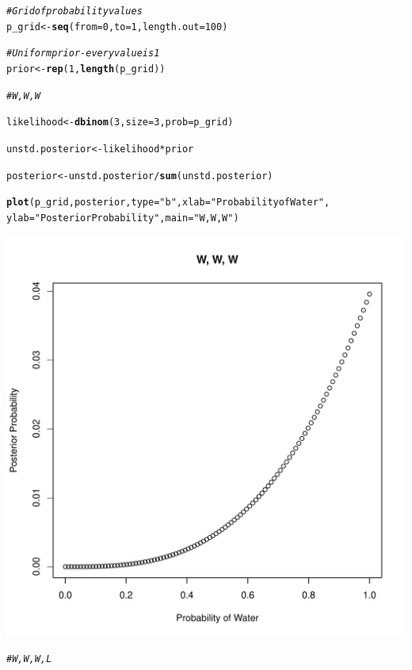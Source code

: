 \documentclass[12pt]{article}\usepackage[]{graphicx}\usepackage[]{color}
\makeatletter
\def\maxwidth{ %
  \ifdim\Gin@nat@width>\linewidth
    \linewidth
  \else
    \Gin@nat@width
  \fi
}
\newcommand{\hlnum}[1]{\textcolor[rgb]{0.686,0.059,0.569}{#1}}%
\newcommand{\hlstr}[1]{\textcolor[rgb]{0.192,0.494,0.8}{#1}}%
\newcommand{\hlcom}[1]{\textcolor[rgb]{0.678,0.584,0.686}{\textit{#1}}}%
\newcommand{\hlopt}[1]{\textcolor[rgb]{0,0,0}{#1}}%
\newcommand{\hlstd}[1]{\textcolor[rgb]{0.345,0.345,0.345}{#1}}%
\newcommand{\hlkwb}[1]{\textcolor[rgb]{0.69,0.353,0.396}{#1}}%
\newcommand{\hlkwc}[1]{\textcolor[rgb]{0.333,0.667,0.333}{#1}}%
\newcommand{\hlkwd}[1]{\textcolor[rgb]{0.737,0.353,0.396}{\textbf{#1}}}%
\newenvironment{kframe}{%
 \def\at@end@of@kframe{}%
 \ifinner\ifhmode%
  \def\at@end@of@kframe{\end{minipage}}%
  \begin{minipage}{\columnwidth}%
 \fi\fi%
 \def\FrameCommand##1{\hskip\@totalleftmargin \hskip-\fboxsep
 \colorbox{shadecolor}{##1}\hskip-\fboxsep
     \hskip-\linewidth \hskip-\@totalleftmargin \hskip\columnwidth}%
 \MakeFramed {\advance\hsize-\width
   \@totalleftmargin\z@ \linewidth\hsize
   \@setminipage}}%
 {\par\unskip\endMakeFramed%
 \at@end@of@kframe}
\newenvironment{knitrout}{}{} %
\makeatother
\begin{document}
\begin{knitrout}
\color{fgcolor}\begin{kframe}
\begin{alltt}
\hlcom{#Grid of probability values}
\hlstd{p_grid} \hlkwb{<-} \hlkwd{seq}\hlstd{(}\hlkwc{from} \hlstd{=} \hlnum{0}\hlstd{,} \hlkwc{to} \hlstd{=} \hlnum{1}\hlstd{,} \hlkwc{length.out} \hlstd{=} \hlnum{100}\hlstd{)}

\hlcom{#Uniform prior - every value is 1}
\hlstd{prior} \hlkwb{<-} \hlkwd{rep}\hlstd{(}\hlnum{1}\hlstd{,} \hlkwd{length}\hlstd{(p_grid))}

\hlcom{#W, W, W}

\hlstd{likelihood} \hlkwb{<-} \hlkwd{dbinom}\hlstd{(}\hlnum{3}\hlstd{,} \hlkwc{size} \hlstd{=} \hlnum{3}\hlstd{,} \hlkwc{prob} \hlstd{= p_grid)}

\hlstd{unstd.posterior} \hlkwb{<-} \hlstd{likelihood} \hlopt{*} \hlstd{prior}

\hlstd{posterior} \hlkwb{<-} \hlstd{unstd.posterior}\hlopt{/}\hlkwd{sum}\hlstd{(unstd.posterior)}

\hlkwd{plot}\hlstd{(p_grid, posterior,} \hlkwc{type} \hlstd{=} \hlstr{"b"}\hlstd{,} \hlkwc{xlab} \hlstd{=} \hlstr{"Probability of Water"}\hlstd{,}
     \hlkwc{ylab} \hlstd{=} \hlstr{"Posterior Probability"}\hlstd{,} \hlkwc{main} \hlstd{=} \hlstr{"W, W, W"}\hlstd{)}
\end{alltt}
\end{kframe}
\includegraphics[width=\maxwidth]{figure/unnamed-chunk-2-1} 
\begin{kframe}\begin{alltt}
\hlcom{#W, W, W, L}


\end{alltt}
\end{kframe}
\end{knitrout}
\end{document}
